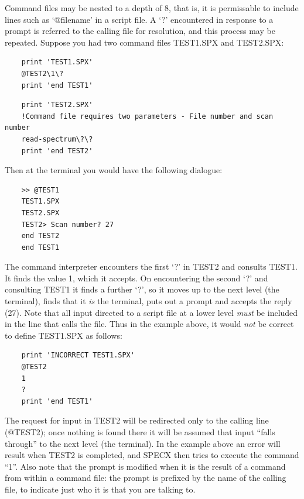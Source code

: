 \documentclass[11pt,twoside]{report}
\begin{document}
Command files may be nested to a depth of 8, that
is, it is permissable to include lines such as `@filename' in a script
file. A `?' encountered in response to a prompt is referred to
the calling file for resolution, and this process may be repeated. Suppose you
had two command files TEST1.SPX and TEST2.SPX: 

\begin{verbatim}
    print 'TEST1.SPX'
    @TEST2\1\?
    print 'end TEST1'
\end{verbatim}

\begin{verbatim}
    print 'TEST2.SPX'
    !Command file requires two parameters - File number and scan number
    read-spectrum\?\?
    print 'end TEST2'
\end{verbatim}

Then at the terminal you would have the following dialogue:

\begin{verbatim}
    >> @TEST1
    TEST1.SPX
    TEST2.SPX
    TEST2> Scan number? 27
    end TEST2
    end TEST1
\end{verbatim}

The command interpreter encounters the first `?' in TEST2 and consults
TEST1. It finds the value 1, which it accepts. On encountering the second `?'
and consulting TEST1 it finds a further `?', so it moves up to the next level
(the terminal), finds that it {\em is} the terminal, puts out a prompt and
accepts the reply (27). Note that all input directed to a script 
file at a lower level {\em must} be included in the line that calls the file.
Thus in the example above, it would {\em not} be correct to define TEST1.SPX
as follows:

\begin{verbatim}
    print 'INCORRECT TEST1.SPX'
    @TEST2
    1
    ?
    print 'end TEST1'
\end{verbatim}

The request for input in TEST2 will be redirected only to the calling line
(@TEST2); once nothing is found there it will be assumed that input ``falls
through'' to the next level (the terminal). In the example above an error will
result when TEST2 is completed, and SPECX then tries to execute the command
``1''. Also note that the prompt is modified when it is
the result of a command from within a command file: the prompt is prefixed by
the name of the calling file, to indicate just who it is that you are talking
to. 
\end{document}
